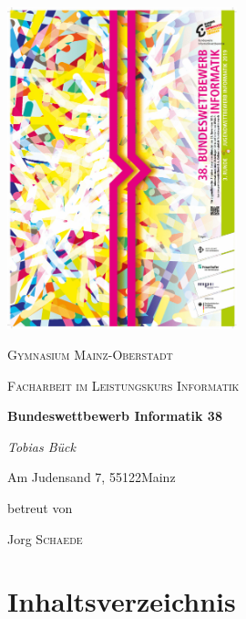 \documentclass[a4paper,12pt,arial]{scrartcl}
\newcommand{\Name}{Tobias Bück}
\newcommand{\Strasse}{Am Judensand 7}
\newcommand{\Ort}{Mainz}
\newcommand{\PLZ}{55122}
\newcommand{\Schule}{Gymnasium Mainz-Oberstadt}
\newcommand{\Leistungskurs}{Informatik}
\newcommand{\Betreuer}{Jorg \textsc{Schaede}}
\newcommand{\Thema}{Bundeswettbewerb Informatik 38}
\begin{document}
\begin{titlepage}
	\centering
	\includegraphics[width=0.5\textwidth]{BWinf38_image.pdf}
	\\
    \textit{\textcite{bwinfPlakat}}
	\par\vspace{1cm}
	
	{\scshape\LARGE \Schule \par}
	\vspace{1cm}
	{\scshape\Large Facharbeit im Leistungskurs \Leistungskurs\par}
	\vspace{1.5cm}
	{\huge\bfseries \Thema\par}
	\vspace{2cm}
	{\Large\itshape \Name\par}
	\small{\Strasse, \PLZ \space \Ort}
	\vfill
\par
	betreut von\par
	\Betreuer

\end{titlepage}

\begin{abstract}
Diese Arbeit handelt von der Bearbeitung des Bundeswettbewerb Informatik 38. Dabei werden Graphentheorie, Algorithmen und Datenstrukturen zur Lösung komplexer Probleme genutzt. In der ersten Aufgabe wird ein Computer-Programm entwickelt, welches das Brettspiel Stromrallye löst. Bei der 2. Aufgabe geht es darum in einem Straßennetz den Weg zu finden, der am schnellsten ist, aber auch wenige Abbiegungen beinhaltet. \cite{bwinfSpielfeld}
\end{abstract}
\section{Inhaltsverzeichnis}
\tableofcontents
\end{document}
